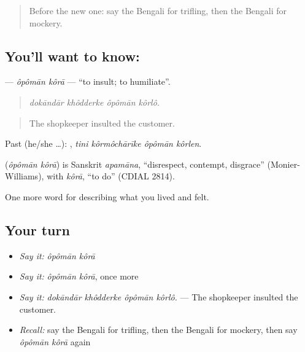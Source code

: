 \label{lesson:BN-C450-opoman-kora}



\begin{quote}
Before the new one: say the Bengali for trifling, then the Bengali for mockery.
\end{quote}

\subsection*{You'll want to know:  }
\textbf{ } — \emph{ôpômān kôrā} — \textquotedblleft{}to insult; to humiliate\textquotedblright{}.

\begin{quote}
   
\end{quote}

\begin{quote}
\emph{dokāndār khôdderke ôpômān kôrlô.}
\end{quote}

\begin{quote}
The shopkeeper insulted the customer.
\end{quote}

Past (he/she …):    , \emph{tini kôrmôchārīke ôpômān kôrlen}.

\begin{cousinweb}
\textbf{ } (\emph{ôpômān kôrā}) is Sanskrit \emph{apamāna}, \textquotedblleft{}disrespect, contempt, disgrace\textquotedblright{} (Monier-Williams), with \emph{kôrā}, \textquotedblleft{}to do\textquotedblright{} (CDIAL 2814).
\end{cousinweb}

\begin{grammarlens}[title={What you've built}]
One more word for describing what you lived and felt.
\end{grammarlens}

\subsection*{Your turn}
\begin{itemize}
\raggedright
  \item \emph{Say it:} \emph{ôpômān kôrā}
  \item \emph{Say it:} \emph{ôpômān kôrā}, once more
  \item \emph{Say it:} \emph{dokāndār khôdderke ôpômān kôrlô.} — The shopkeeper insulted the customer.
  \item \emph{Recall:} say the Bengali for trifling, then the Bengali for mockery, then say \emph{ôpômān kôrā} again
\end{itemize}

